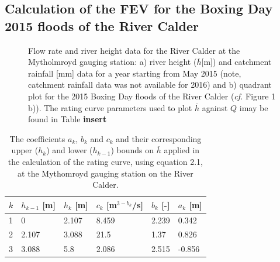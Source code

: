 \documentclass[11pt,a4paper]{article}
\begin{document}
\subsection{Calculation of the FEV for the Boxing Day 2015 floods of the River Calder}
\begin{figure}[H]
\centering
{}
\hfill
{}
\caption{Flow rate and river height data for the River Calder at the Mytholmroyd gauging station: a) river height ($\overline{h}$[m]) \cite{Calder-Don} and catchment rainfall [mm] data \cite{NRFA} for a year starting from May 2015 (note, catchment rainfall data was not available for 2016) and b) quadrant plot for the 2015 Boxing Day floods of the River Calder (\textit{cf.} Figure 1 b)). The rating curve parameters used to plot $\overline{h}$ against $Q$ imay be found in Table \textbf{insert}}
\end{figure}

\begin{table}[H]
\centering
\begin{tabular}{l|l|l|l|l|l}
$k$ & $h_{k-1}$ [m] & $h_k$ [m] & $c_k$ [m$^{3-b_k}$/s] & $b_k$ [-] & $a_k$ [m]\\
\hline
1 & 0 & 2.107 & 8.459 & 2.239 & 0.342 \\
2 & 2.107 & 3.088 & 21.5 & 1.37 & 0.826 \\
3 & 3.088 & 5.8 & 2.086 & 2.515 & -0.856 \\
\end{tabular}
\caption{The coefficients $a_k$, $b_k$ and $c_k$ and their corresponding upper ($h_k$) and lower ($h_{k-1}$) bounds on $\overline{h}$ \cite{Calder-Don} applied in the calculation of the rating curve, using equation 2.1, at the Mythomroyd gauging station on the River Calder.}
\end{table}
\end{document}
